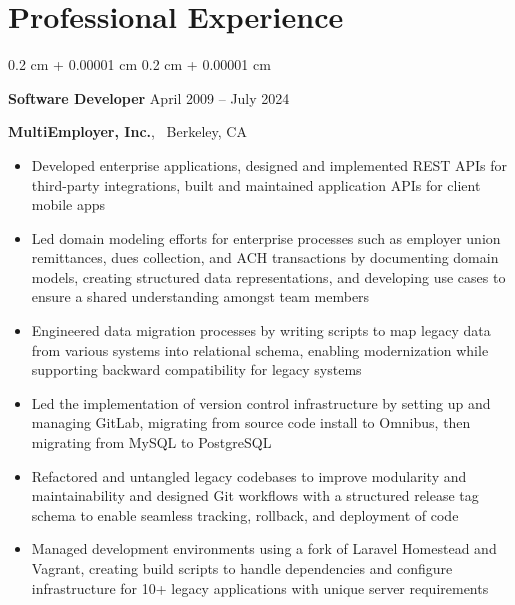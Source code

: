 \documentclass[10pt, letterpaper]{article}
\newenvironment{highlights}{
    \begin{itemize}[
        topsep=0.10 cm,
        parsep=0.10 cm,
        partopsep=0pt,
        itemsep=0pt,
        leftmargin=0.4 cm + 10pt
    ]
}{
    \end{itemize}
} %
\newenvironment{onecolentry}{
    \begin{adjustwidth}{
        0.2 cm + 0.00001 cm
    }{
        0.2 cm + 0.00001 cm
    }
}{
    \end{adjustwidth}
} %
\begin{document}
        \vspace{0.2 cm}
            
    \section{Professional Experience}
        
            \begin{onecolentry}
                \textbf{Software Developer} \hfill April 2009 -- July 2024

                \textbf{MultiEmployer, Inc.}, \textbar\ Berkeley, CA
                \begin{highlights}
                    
                        \item Developed enterprise applications, designed and implemented REST APIs for third-party integrations, built and maintained application APIs for client mobile apps
                    
                        \item Led domain modeling efforts for enterprise processes such as employer union remittances, dues collection, and ACH transactions by documenting domain models, creating structured data representations, and developing use cases to ensure a shared understanding amongst team members
                    
                        \item Engineered data migration processes by writing scripts to map legacy data from various systems into relational schema, enabling modernization while supporting backward compatibility for legacy systems
                    
                        \item Led the implementation of version control infrastructure by setting up and managing GitLab, migrating from source code install to Omnibus, then migrating from MySQL to PostgreSQL
                    
                        \item Refactored and untangled legacy codebases to improve modularity and maintainability and designed Git workflows with a structured release tag schema to enable seamless tracking, rollback, and deployment of code
                    
                        \item Managed development environments using a fork of Laravel Homestead and Vagrant, creating build scripts to handle dependencies and configure infrastructure for 10+ legacy applications with unique server requirements
                    

\end{highlights}
\end{onecolentry}
\end{document}
